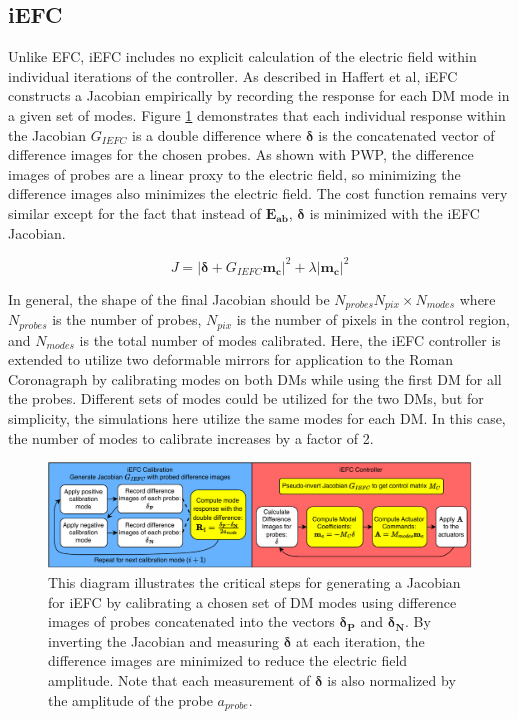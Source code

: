 \documentclass[12pt]{spieman}  %
\begin{document}
\begin{spacing}{2}
\subsection{iEFC}
\label{sec:iefc}
Unlike EFC, iEFC includes no explicit calculation of the electric field within individual iterations of the controller. As described in Haffert et al\cite{haffert-iefc}, iEFC constructs a Jacobian empirically by recording the response for each DM mode in a given set of modes. Figure \ref{fig:iefc-flowchart} demonstrates that each individual response within the Jacobian $G_{IEFC}$ is a double difference where $\mathbf{\delta}$ is the concatenated vector of difference images for the chosen probes. As shown with PWP, the difference images of probes are a linear proxy to the electric field, so minimizing the difference images also minimizes the electric field\cite{haffert-iefc}. The cost function remains very similar except for the fact that instead of $\mathbf{E_{ab}}$, $\mathbf{\delta}$ is minimized with the iEFC Jacobian. 

\begin{equation}
    \label{eq:iefc-1}
    J = |\mathbf{\delta} + G_{IEFC}\mathbf{m_c}|^2  + \lambda|\mathbf{m_c}|^2
\end{equation}

In general, the shape of the final Jacobian should be $N_{probes} N_{pix} \times N_{modes}$ where $N_{probes}$ is the number of probes, $N_{pix}$ is the number of pixels in the control region, and $N_{modes}$ is the total number of modes calibrated. Here, the iEFC controller is extended to utilize two deformable mirrors for application to the Roman Coronagraph by calibrating modes on both DMs while using the first DM for all the probes. Different sets of modes could be utilized for the two DMs, but for simplicity, the simulations here utilize the same modes for each DM. In this case, the number of modes to calibrate increases by a factor of 2. 

\begin{figure}[h]
    \centering
    \includegraphics[scale=0.75]{figs-general/iefc_flow.pdf}
    \caption{This diagram illustrates the critical steps for generating a Jacobian for iEFC by calibrating a chosen set of DM modes using difference images of probes concatenated into the vectors $\mathbf{\delta_P}$ and $\mathbf{\delta_N}$. By inverting the Jacobian and measuring $\mathbf{\delta}$ at each iteration, the difference images are minimized to reduce the electric field amplitude. Note that each measurement of $\mathbf{\delta}$ is also normalized by the amplitude of the probe $a_{probe}$.}
    \label{fig:iefc-flowchart}
\end{figure}


\end{spacing}
\end{document}
